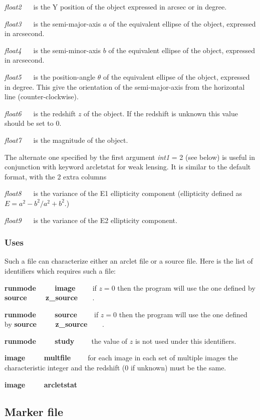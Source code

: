 {\sl float2 \ \ } is the Y position of the object expressed in arcsec or in degree.

{\sl float3 \ \ } is the semi-major-axis $a$ of the equivalent ellipse of the 
object, expressed in arcsecond.

{\sl float4 \ \ } is the semi-minor-axis $b$ of the equivalent ellipse of the 
object, expressed in arcsecond.

{\sl float5 \ \ } is the position-angle $\theta$ of the equivalent ellipse of the 
object, expressed in degree. This give the orientation of the semi-major-axis
from the horizontal line (counter-clockwise).

{\sl float6 \ \ } is the redshift $z$ of the object. If the redshift is unknown
this value should be set to $0$.

{\sl float7 \ \ } is the magnitude of the object.

The alternate one specified by the first argument {\sl int1} = 2 (see
below) is useful in conjunction with keyword arcletstat for weak
lensing. It is similar to the default format, with the 2 extra columns

{\sl float8 \ \ } is the variance of the E1 ellipticity component
(ellipticity defined as $E = a^2 - b^2 / a^2 + b^2$.)

{\sl float9 \ \ } is the variance of the E2 ellipticity component.

\subsubsection{Uses}

Such a file can characterize either an arclet file or a source file.
Here is the list of identifiers which requires such a file:

{\bf runmode \ \ \ \ image \ \ \ } if $z=0$ then the program will use the
one defined by {\bf source \ \ \ \ z{\_}source \ \ \ }.

{\bf runmode \ \ \ \ source \ \ \ } if $z=0$ then the program will use the
one defined by {\bf source \ \ \ \ z{\_}source \ \ \ }.

{\bf runmode \ \ \ \ study \ \ \ } the value of $z$ is not used under this
identifiers.

{\bf image \ \ \ \ multfile \ \ \ } for each image in each set of multiple
images the characteristic integer and the redshift ($0$ if unknown)
must be the same.

{\bf image \ \ \ \ arcletstat \ \ \ }

\subsection{Marker file}

